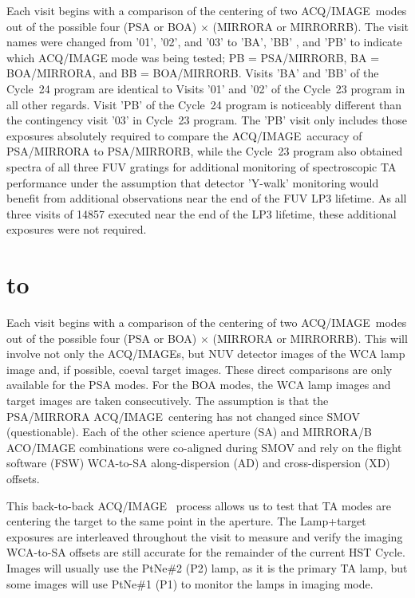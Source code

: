 \documentclass[12pt]{reportj}
\newcommand*{\myfont}{\fontfamily{rm}\selectfont}
\def\acqimage{{\myfont ACQ/IMAGE}\rm}
\def\acqimages{{\myfont ACQ/IMAGE{\rm s}}\rm}
\def\ssection#1{\addtocounter{section}{1} \setcounter{subsection}{0} \section*{\hbox to \hsize{\large\bf \arabic{section}. #1\hfill }}}
\begin{document}
Each visit begins with a comparison of the centering of two \acqimage~modes out of the possible four (PSA or BOA) $\times$ (MIRRORA or MIRRORRB). The visit names were changed from '01', '02', and '03' to 'BA', 'BB' , and 'PB' to indicate which ACQ/IMAGE mode was being tested; PB = PSA/MIRRORB, BA = BOA/MIRRORA, and BB = BOA/MIRRORB. Visits 'BA' and 'BB' of the Cycle~24 program are identical to Visits '01' and '02' of the Cycle~23 program in all other regards.
Visit 'PB' of the Cycle~24 program is noticeably different than the contingency visit '03' in Cycle~23 program. The 'PB' visit only includes those exposures absolutely required to compare the \acqimage~accuracy of PSA/MIRRORA to PSA/MIRRORB, while the Cycle~23 program also obtained spectra of all three FUV gratings for additional monitoring of spectroscopic TA performance under the assumption that detector 'Y-walk' monitoring would benefit from additional observations near the end of the FUV LP3 lifetime. As all three visits of 14857 executed near the end of the LP3 lifetime, these additional exposures were not required.
\clearpage
\ssection{Program Structure \label{sec:structure}}
Each visit begins with a comparison of the centering of two \acqimage~modes out of the possible four (PSA or BOA) $\times$ (MIRRORA or MIRRORRB). This will involve not only the \acqimages, but NUV detector images of the WCA lamp image and, if possible, coeval target images. These direct comparisons are only available for the PSA modes. For the BOA modes, the WCA lamp images and target images are taken consecutively. The assumption is that the PSA/MIRRORA \acqimage~centering has not changed since SMOV (questionable). Each of the other science aperture (SA) and MIRRORA/B ACO/IMAGE combinations were co-aligned during SMOV and rely on the flight software
(FSW) WCA-to-SA along-dispersion (AD) and cross-dispersion (XD) offsets.

This back-to-back \acqimage~ process allows us to test that TA modes are centering the target to the same point in the aperture. The Lamp+target exposures are interleaved throughout the visit to measure and verify the imaging WCA-to-SA offsets are still accurate for the remainder of the current HST Cycle. Images will usually use the PtNe\#2 (P2) lamp, as it is the primary TA lamp, but some images will use PtNe\#1 (P1) to monitor the lamps in imaging mode.
\end{document}
